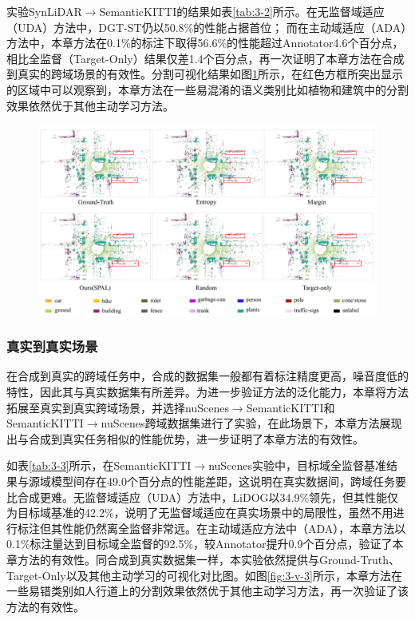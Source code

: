 \vspace{-0.35cm}
\vspace{0.1cm}

实验SynLiDAR\(\to\)SemanticKITTI的结果如表\ref{tab:3-2}所示。在无监督域适应（UDA）方法中，DGT-ST仍以50.8\%的性能占据首位；
而在主动域适应（ADA）方法中，本章方法在0.1\%的标注下取得56.6\%的性能超过Annotator4.6个百分点，相比全监督（Target-Only）结果仅差1.4个百分点，再一次证明了本章方法在合成到真实的跨域场景的有效性。分割可视化结果如图\ref{fig:3-v-2}所示，在红色方框所突出显示的区域中可以观察到，本章方法在一些易混淆的语义类别比如植物和建筑中的分割效果依然优于其他主动学习方法。
\begin{figure}[H]
    \centering
    \includegraphics[width = \textwidth]{ljx/figure/3_vision_s2p.pdf}
    \label{fig:3-v-2}
    \vspace{-0.35cm}
\end{figure}


\subsubsection{真实到真实场景}
在合成到真实的跨域任务中，合成的数据集一般都有着标注精度更高，噪音度低的特性，因此其与真实数据集有所差异。为进一步验证方法的泛化能力，本章将方法拓展至真实到真实跨域场景，并选择nuScenes\(\to\)SemanticKITTI和SemanticKITTI\(\to\)nuScenes跨域数据集进行了实验，在此场景下，本章方法展现出与合成到真实任务相似的性能优势，进一步证明了本章方法的有效性。

如表\ref{tab:3-3}所示，在SemanticKITTI$\to$nuScenes实验中，目标域全监督基准结果与源域模型间存在49.0个百分点的性能差距，这说明在真实数据间，跨域任务要比合成更难。无监督域适应（UDA）方法中，LiDOG以34.9\%领先，但其性能仅为目标域基准的42.2\%，说明了无监督域适应在真实场景中的局限性，虽然不用进行标注但其性能仍然离全监督非常远。在主动域适应方法中（ADA），本章方法以0.1\%标注量达到目标域全监督的92.5\%，较Annotator提升0.9个百分点，验证了本章方法的有效性。同合成到真实数据集一样，本实验依然提供与Ground-Truth、Target-Only以及其他主动学习的可视化对比图。如图\ref{fig:3-v-3}所示，本章方法在一些易错类别如人行道上的分割效果依然优于其他主动学习方法，再一次验证了该方法的有效性。


